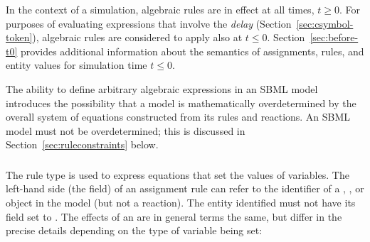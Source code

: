 In the context of a simulation, algebraic rules are in effect at
all times, $t \geq 0$.  For purposes of evaluating expressions
that involve the \emph{delay} 
(Section~\ref{sec:csymbol-token}), algebraic rules are considered
to apply also at $t \leq 0$.  Section~\ref{sec:before-t0} provides
additional information about the semantics of assignments, rules,
and entity values for simulation time $t \leq 0$.

The ability to define arbitrary algebraic expressions in an SBML
model introduces the possibility that a model is mathematically
overdetermined by the overall system of equations constructed from
its rules and reactions.  An SBML model must not be
overdetermined; this is discussed in
Section~\ref{sec:ruleconstraints} below.


\subsubsection{}
\label{sec:assignmentrule}

The rule type \AssignmentRule is used to express equations that
set the values of variables.  The left-hand side (the
 field) of an assignment rule can refer to the
identifier of a \Species, \Compartment, or \Parameter object in
the model (but not a reaction).  The entity identified must not
have its  field set to .  The effects of
an \AssignmentRule are in general terms the same, but differ in
the precise details depending on the type of variable being set:

